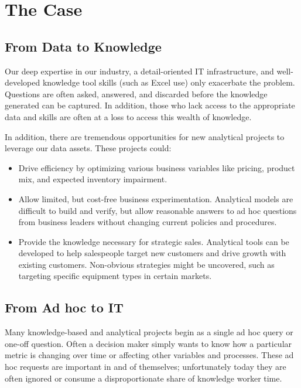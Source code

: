 \documentclass[10pt,journal,compsoc]{IEEEtran}
\begin{document}
\section{The Case}

    \subsection{From Data to Knowledge}

    Our deep expertise in our industry, a detail-oriented IT infrastructure,
    and well-developed knowledge tool skills (such as Excel use) only
    exacerbate the problem.  Questions are often asked, answered, and
    discarded  before the knowledge generated can be captured.  In addition,
    those who lack access to the appropriate data and skills are often at a
    loss to access this wealth of knowledge.

    In addition, there are tremendous opportunities for new analytical
    projects to leverage our data assets.  These projects could:

    \begin{itemize}
        \item Drive efficiency by optimizing various business variables like
        pricing, product mix, and expected inventory impairment.

        \item Allow limited, but cost-free business experimentation.  Analytical
        models are difficult to build and verify, but allow reasonable answers
        to ad hoc questions from business leaders without changing current
        policies and procedures.

        \item Provide the knowledge necessary for strategic sales.  Analytical
        tools can be developed to help salespeople target new customers and drive
        growth with existing customers.  Non-obvious strategies might be uncovered,
        such as targeting specific equipment types in certain markets.
    \end{itemize}

    \subsection{From Ad hoc to IT}

    Many knowledge-based and analytical projects begin as a single ad hoc
    query or one-off question.  Often a decision maker simply wants to know
    how a particular metric is changing over time or affecting other variables
    and processes.  These ad hoc requests are important in and of themselves;
    unfortunately today they are often ignored or consume a disproportionate
    share of knowledge worker time.
\end{document}
